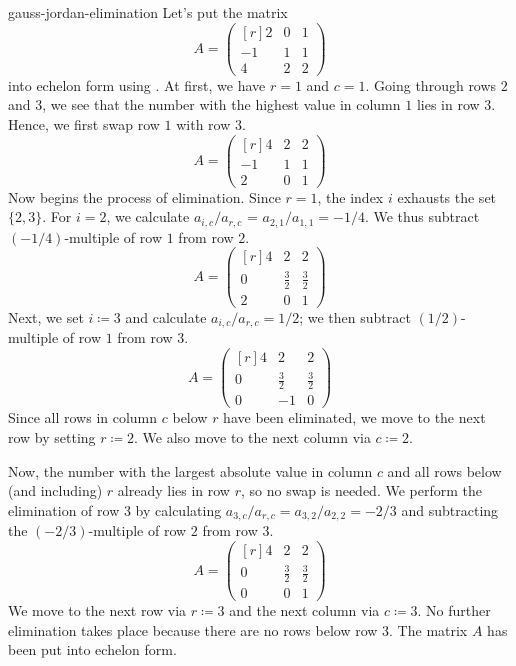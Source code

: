 \begin{example}{}{gauss-jordan-elimination}
 Let's put the matrix
 \[
  A = \left( 
   \begin{matrix*}[r]
    2 & 0 & 1\\
    -1 & 1 & 1\\
    4 & 2 & 2
   \end{matrix*}
  \right)
 \]
 into echelon form using . At
 first, we have $r = 1$ and $c = 1$. Going through rows $2$ and $3$, we see that
 the number with the highest value in column $1$ lies in row $3$. Hence, we
 first swap row $1$ with row $3$.
 \[
  A = \left( 
   \begin{matrix*}[r]
    4 & 2 & 2\\
    -1 & 1 & 1\\
    2 & 0 & 1
   \end{matrix*}
  \right)
 \]
 Now begins the process of elimination. Since $r = 1$, the index $i$ exhausts
 the set $\{2,3\}$. For $i = 2$, we calculate $a_{i,c} / a_{r,c}$ = $a_{2,1} /
 a_{1,1} = -1 / 4$. We thus subtract $(-1 / 4)$-multiple of row $1$ from row
 $2$. 
 \[
  A = \left( 
   \begin{matrix*}[r]
    4 & 2 & 2\\
    0 & \frac{3}{2} & \frac{3}{2}\\
    2 & 0 & 1
   \end{matrix*}
  \right)
 \]
 Next, we set $i \coloneqq 3$ and calculate $a_{i,c} / a_{r,c} = 1 / 2$; we then
 subtract $(1 / 2)$-multiple of row $1$ from row $3$.
 \[
  A = \left( 
   \begin{matrix*}[r]
    4 & 2 & 2\\
    0 & \frac{3}{2} & \frac{3}{2}\\
    0 & -1 & 0
   \end{matrix*}
  \right)
 \]
 Since all rows in column $c$ below $r$ have been eliminated, we move to the
 next row by setting $r \coloneqq 2$. We also move to the next column via $c
 \coloneqq 2$.

 Now, the number with the largest absolute value in column $c$ and all rows
 below (and including) $r$ already lies in row $r$, so no swap is needed. We
 perform the elimination of row $3$ by calculating $a_{3,c} / a_{r,c} = a_{3,2}
 / a_{2,2} = - 2 / 3$ and subtracting the $(-2 / 3)$-multiple of row $2$ from
 row $3$.
 \[
  A = \left( 
   \begin{matrix*}[r]
    4 & 2 & 2\\
    0 & \frac{3}{2} & \frac{3}{2}\\
    0 & 0 & 1
   \end{matrix*}
  \right)
 \]
 We move to the next row via $r \coloneqq 3$ and the next column via $c
 \coloneqq 3$. No further elimination takes place because there are no rows
 below row $3$. The matrix $A$ has been put into echelon form.
\end{example}

